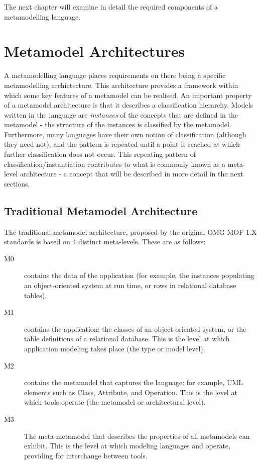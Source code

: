 \noindent The next chapter will examine in detail the required
components of a metamodelling language.

\section{Metamodel Architectures}
\label{metaarch}

A metamodelling language places requirements on there being a
specific metamodelling archictecture. This architecture provides a
framework within which some key features of a metamodel can be
realised. An important property of a metamodel architecture is
that it describes a classification hierarchy. Models written in
the language are {\em instances} of the concepts that are defined
in the metamodel - the structure of the instances is classified by
the metamodel. Furthermore, many  languages have their own notion
of classification (although they need not), and the pattern is
repeated until a point is reached at which further classification
does not occur. This repeating pattern of
classification/instantiation contributes to what is commonly known
as a meta-level architecture - a concept that will be described in
more detail in the next sections.

\subsection{Traditional Metamodel Architecture}

The traditional metamodel architecture, proposed by the original
OMG MOF 1.X standards is based on 4 distinct meta-levels. These
are as follows:

\begin{description}
\item[M0] contains the data of the application (for example, the
instances populating an object-oriented system at run time, or
rows in relational database tables). \item[M1] contains the
application: the classes of an object-oriented system, or the
table definitions of a relational database. This is the level at
which application modeling takes place (the type or model level).
\item[M2] contains the metamodel that captures the language: for
example, UML elements such as Class, Attribute, and Operation.
This is the level at which tools operate (the metamodel or
architectural level). \item[M3] The meta-metamodel that describes
the properties of all metamodels can exhibit. This is the level at
which modeling languages and operate, providing for interchange
between tools.
\end{description}

